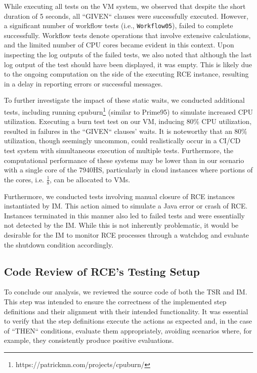While executing all tests on the \ac{VM} system, we observed that despite the short duration of 5 seconds, all ``GIVEN`` clauses were successfully executed. However, a significant number of workflow tests (i.e., \texttt{Workflow05}), failed to complete successfully. Workflow tests denote operations that involve extensive calculations, and the limited number of CPU cores became evident in this context. Upon inspecting the log outputs of the failed tests, we also noted that although the last log output of the test should have been displayed, it was empty. This is likely due to the ongoing computation on the side of the executing \ac{RCE} instance, resulting in a delay in reporting errors or successful messages.

To further investigate the impact of these static waits, we conducted additional tests, including running cpuburn\footnote{https://patrickmn.com/projects/cpuburn/} (similar to Prime95) to simulate increased CPU utilization. Executing a burn test test on our VM, inducing 80\% CPU utilization, resulted in failures in the ``GIVEN`` clauses' waits. It is noteworthy that an 80\% utilization, though seemingly uncommon, could realistically occur in a CI/CD test system with simultaneous execution of multiple tests. Furthermore, the computational performance of these systems may be lower than in our scenario with a single core of the 7940HS, particularly in cloud instances where portions of the cores, i.e. $\frac{1}{8}$, can be allocated to \acp{VM}.

Furthermore, we conducted tests involving manual closure of \ac{RCE} instances instantiated by \ac{IM}. This action aimed to simulate a Java error or crash of \ac{RCE}. Instances terminated in this manner also led to failed tests and were essentially not detected by the \ac{IM}. While this is not inherently problematic, it would be desirable for the \ac{IM} to monitor \ac{RCE} processes through a watchdog and evaluate the shutdown condition accordingly.

\subsection{Code Review of \ac{RCE}'s Testing Setup}
\label{subsec:CodeReview}
To conclude our analysis, we reviewed the source code of both the \ac{TSR} and \ac{IM}. This step was intended to ensure the correctness of the implemented step definitions and their alignment with their intended functionality. It was essential to verify that the step definitions execute the actions as expected and, in the case of ``THEN`` conditions, evaluate them appropriately, avoiding scenarios where, for example, they consistently produce positive evaluations.

